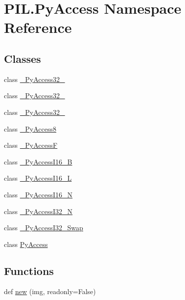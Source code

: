 \hypertarget{namespacePIL_1_1PyAccess}{}\section{P\+I\+L.\+Py\+Access Namespace Reference}
\label{namespacePIL_1_1PyAccess}
\subsection*{Classes}
\begin{DoxyCompactItemize}
\item 
class \hyperlink{classPIL_1_1PyAccess_1_1__PyAccess32__2}{\+\_\+\+Py\+Access32\+\_}
\item 
class \hyperlink{classPIL_1_1PyAccess_1_1__PyAccess32__3}{\+\_\+\+Py\+Access32\+\_}
\item 
class \hyperlink{classPIL_1_1PyAccess_1_1__PyAccess32__4}{\+\_\+\+Py\+Access32\+\_}
\item 
class \hyperlink{classPIL_1_1PyAccess_1_1__PyAccess8}{\+\_\+\+Py\+Access8}
\item 
class \hyperlink{classPIL_1_1PyAccess_1_1__PyAccessF}{\+\_\+\+Py\+AccessF}
\item 
class \hyperlink{classPIL_1_1PyAccess_1_1__PyAccessI16__B}{\+\_\+\+Py\+Access\+I16\+\_\+B}
\item 
class \hyperlink{classPIL_1_1PyAccess_1_1__PyAccessI16__L}{\+\_\+\+Py\+Access\+I16\+\_\+L}
\item 
class \hyperlink{classPIL_1_1PyAccess_1_1__PyAccessI16__N}{\+\_\+\+Py\+Access\+I16\+\_\+N}
\item 
class \hyperlink{classPIL_1_1PyAccess_1_1__PyAccessI32__N}{\+\_\+\+Py\+Access\+I32\+\_\+N}
\item 
class \hyperlink{classPIL_1_1PyAccess_1_1__PyAccessI32__Swap}{\+\_\+\+Py\+Access\+I32\+\_\+\+Swap}
\item 
class \hyperlink{classPIL_1_1PyAccess_1_1PyAccess}{Py\+Access}
\end{DoxyCompactItemize}
\subsection*{Functions}
\begin{DoxyCompactItemize}
\item 
def \hyperlink{namespacePIL_1_1PyAccess_af4ffe30cdfeb35ecea5dac2a1a70c50e}{new} (img, readonly=False)
\end{DoxyCompactItemize}
